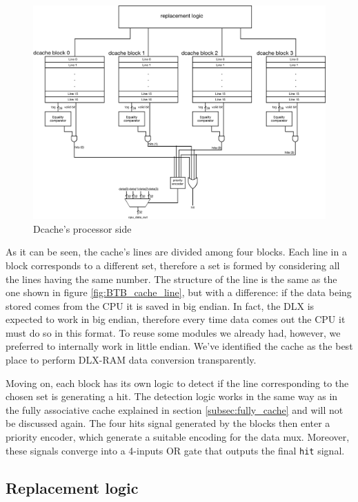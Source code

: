 \begin{figure}[!ht]
	\centering
	\includegraphics[width=\linewidth]{./chapters/figures/dcache.pdf}
	\caption{Dcache's processor side}
	\label{fig:dcache}
\end{figure}

As it can be seen, the cache's lines are divided among four blocks. Each line in a block corresponds to a different set, therefore a set is formed by considering all the lines having the same
number. The structure of the line is the same as the one shown in figure \ref{fig:BTB_cache_line}, but with a difference: if the data being stored comes from the CPU it is saved in big endian.
In fact, the DLX is expected to work in big endian, therefore every time data comes out the CPU it must do so in this format. To reuse some modules we already had, however, we preferred to internally
work in little endian. We've identified the cache as the best place to perform DLX-RAM data conversion transparently.

Moving on, each block has its own logic to detect if the line corresponding to the chosen set is generating a hit. The detection logic works in the same way as in the fully associative cache explained in section
\ref{subsec:fully_cache} and will not be discussed again. The four hits signal generated by the blocks then enter a priority encoder, which generate a suitable encoding for the data mux. Moreover, these signals
converge into a 4-inputs OR gate that outputs the final \verb|hit| signal.

\subsection{Replacement logic}

